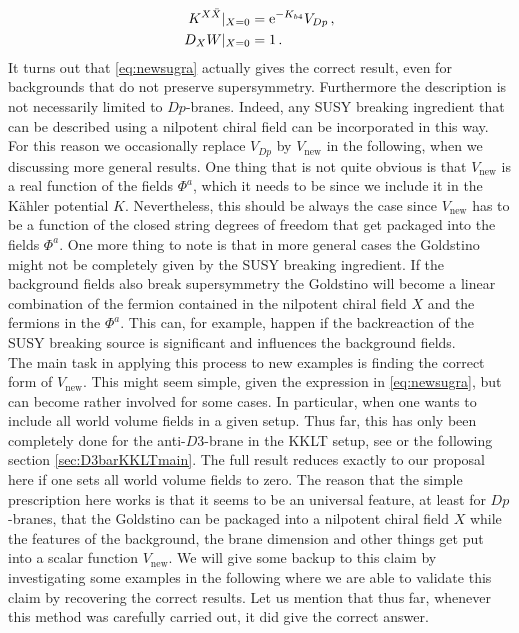 \documentclass[a4paper,12pt,twoside,openright]{report}
\newcommand{\bea}{\begin{equation}\begin{aligned}}
\newcommand{\eea}{\end{aligned}\end{equation}}
\def\rme{{\rm e}}
\begin{document}
\bea 
K^{X\bar{X}}|_{X=0} &= \rme^{-K_{b4}} V_{Dp}\,,\\
D_X W|_{X=0} &= 1\,.
\eea
It turns out that \eqref{eq:newsugra} actually gives the correct result, even for backgrounds that do not preserve supersymmetry. Furthermore the description is not necessarily limited to $Dp$-branes. Indeed, any SUSY breaking ingredient that can be described using a nilpotent chiral field can be incorporated in this way. For this reason we occasionally replace $V_{Dp}$ by $V_{\text{new}}$ in the following, when we discussing more general results. One thing that is not quite obvious is that $V_{\text{new}}$ is a real function of the fields $\Phi^a$, which it needs to be since we include it in the Kähler potential $K$. Nevertheless, this should be always the case since $V_{\text{new}}$ has to be a function of the closed string degrees of freedom that get packaged into the fields $\Phi^a$. One more thing to note is that in more general cases the Goldstino might not be completely given by the SUSY breaking ingredient. If the background fields also break supersymmetry the Goldstino will become a linear combination of the fermion contained in the nilpotent chiral field $X$ and the fermions in the $\Phi^a$. This can, for example, happen if the backreaction of the SUSY breaking source is significant and influences the background fields.\\
The main task in applying this process to new examples is finding the correct form of $V_{\text{new}}$. This might seem simple, given the expression in \eqref{eq:newsugra}, but can become rather involved for some cases. In particular, when one wants to include all world volume fields in a given setup. Thus far, this has only been completely done for the anti-$D3$-brane in the KKLT setup, see \cite{Cribiori:2019hod} or the following section \ref{sec:D3barKKLTmain}. The full result reduces exactly to our proposal here if one sets all world volume fields to zero. The reason that the simple prescription here works is that it seems to be an universal feature, at least for $Dp$-branes, that the Goldstino can be packaged into a nilpotent chiral field $X$ while the features of the background, the brane dimension and other things get put into a scalar function $V_{\text{new}}$. We will give some backup to this claim by investigating some examples in the following where we are able to validate this claim by recovering the correct results. Let us mention that thus far, whenever this method was carefully carried out, it did give the correct answer.
\end{document}
